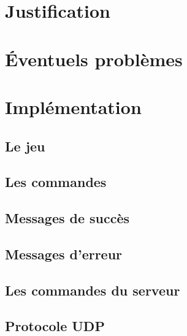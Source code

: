 \documentclass{report}
\begin{document}
	\section{Justification}
		 \label{justification}

	\newpage
	\section{Éventuels problèmes}
		 \label{problemes}
	
	\section{Implémentation}
		\subsection{Le jeu}
			 \label{jeu}
			
		\subsection{Les commandes}
			 \label{commandes}
			
		\subsection{Messages de succès}
			 \label{messagesAcceptes}
			
		\subsection{Messages d'erreur}
			 \label{messagesRefuses}
			
		\subsection{Les commandes du serveur}
			 \label{commandeServeur}		
		
		\subsection{Protocole UDP}
			 \label{udp}
\end{document}
